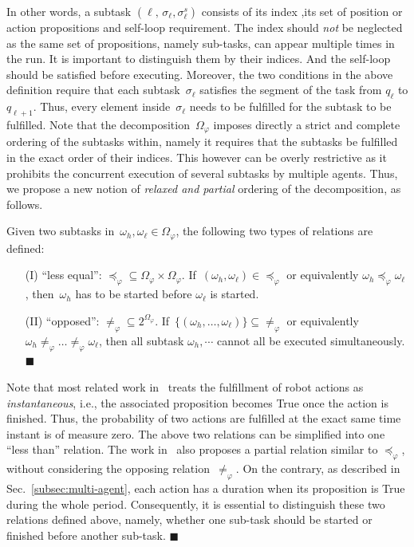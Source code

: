 In other words, a subtask $(\ell,\,\sigma_\ell,\sigma^s_\ell)$ consists of its index
,its set of position or action propositions and self-loop requirement.
The index should \emph{not} be neglected as the same set of propositions, namely sub-tasks,
can appear multiple times in the run.
It is important to distinguish them by their indices. And the self-loop should be satisfied
before executing.
Moreover, the two conditions in the above definition require that
each subtask~$\sigma_\ell$ satisfies the segment of the task from $q_\ell$ to $q_{\ell+1}$.
Thus, every element inside~$\sigma_\ell$ needs to be fulfilled for the subtask to be fulfilled.
Note that the decomposition~$\Omega_{\varphi}$ imposes directly a {strict and complete} ordering of the subtasks within,
namely it requires that the subtasks be fulfilled in the exact order of their indices.
This however can be overly restrictive as it prohibits the concurrent execution of several subtasks by multiple agents.
Thus, we propose a new notion of \emph{relaxed and partial} ordering of the decomposition,
as follows.

\begin{definition}\label{def:partial}
Given two subtasks in~$\omega_h,
\omega_\ell\in \Omega_{\varphi}$,
the following two types of relations are defined:
\begin{itemize}
\item[(I)] ``less equal'': $\preceq_{\varphi}\subseteq \Omega_{\varphi} \times \Omega_{\varphi}$.
If~$(\omega_h, \omega_\ell)\in \preceq_{\varphi}$ or
equivalently $\omega_h\preceq_{\varphi}\omega_\ell$,
then~$\omega_h$ has to be {started} before $\omega_\ell$ is started.
\item[(II)] ``opposed'': $\neq_{\varphi}\subseteq 2^{\Omega_{\varphi}}$.
If~$\{(\omega_h,\dots,\omega_\ell)\}\subseteq \neq_{\varphi}$
or equivalently $\omega_h\neq_{\varphi}\dots\neq_{\varphi}\omega_\ell$,
then all subtask $\omega_h,\cdots$ cannot all be {executed} simultaneously.
\hfill $\blacksquare$
\end{itemize}
\end{definition}

\begin{remark}\label{remark:duration}
Note that most related work in~\citep{kantaros2020stylus, guo2015multi,
tumova2016multi, luo2021abstraction,luo2021temporal, sahin2019multirobot, jones2019scratchs}
treats the fulfillment of robot actions as \emph{instantaneous},
i.e., the associated proposition becomes True once the action is finished.
Thus, the probability of two actions are fulfilled at the exact same time instant is of measure zero.
The above two relations can be simplified into one ``less than'' relation.
{The work in~\citep{luo2021temporal} also proposes a partial relation similar to $\preceq_\varphi$,
 without considering the opposing relation~$\neq_\varphi$.}
On the contrary, as described in Sec.~\ref{subsec:multi-agent},
each action has a duration when its proposition is True during the {whole} period.
Consequently, it is essential to distinguish these two relations defined above,
namely, whether one sub-task should be started or finished before another sub-task.
\hfill  $\blacksquare$
\end{remark}


